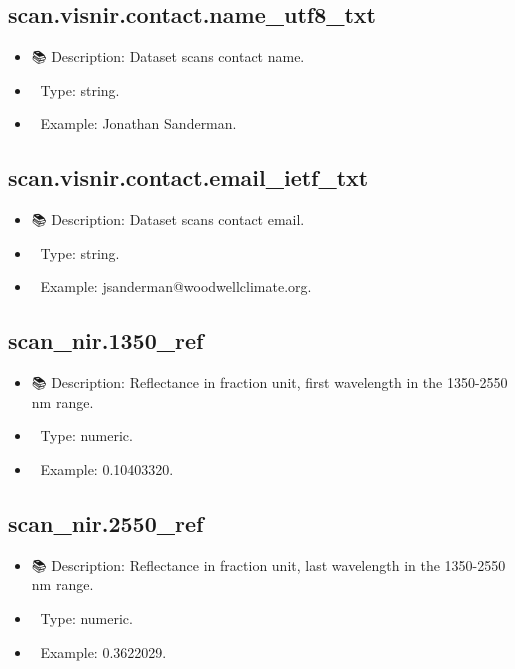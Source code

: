\documentclass[
  letterpaper,
  DIV=11,
  numbers=noendperiod]{scrreprt}
\providecommand{\tightlist}{%
  \setlength{\itemsep}{0pt}\setlength{\parskip}{0pt}}\usepackage{longtable,booktabs,array}
\begin{document}
\subsection{scan.visnir.contact.name\_utf8\_txt}\label{scan.visnir.contact.name_utf8_txt-1}

\begin{itemize}
\tightlist
\item
  📚 Description: Dataset scans contact name.
\item
  🔢 Type: string.
\item
  📖 Example: Jonathan Sanderman.
\end{itemize}

\subsection{scan.visnir.contact.email\_ietf\_txt}\label{scan.visnir.contact.email_ietf_txt-1}

\begin{itemize}
\tightlist
\item
  📚 Description: Dataset scans contact email.
\item
  🔢 Type: string.
\item
  📖 Example: jsanderman@woodwellclimate.org.
\end{itemize}

\subsection{scan\_nir.1350\_ref}\label{scan_nir.1350_ref}

\begin{itemize}
\tightlist
\item
  📚 Description: Reflectance in fraction unit, first wavelength in the
  1350-2550 nm range.
\item
  🔢 Type: numeric.
\item
  📖 Example: 0.10403320.
\end{itemize}

\subsection{scan\_nir.2550\_ref}\label{scan_nir.2550_ref}

\begin{itemize}
\tightlist
\item
  📚 Description: Reflectance in fraction unit, last wavelength in the
  1350-2550 nm range.
\item
  🔢 Type: numeric.
\item
  📖 Example: 0.3622029.
\end{itemize}
\end{document}
